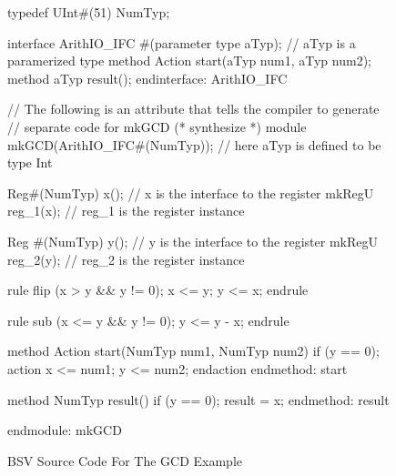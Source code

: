 \documentclass{article}
\newenvironment{libverbatim}
  {\small
   \verbatim}
  {\endverbatim
  }
\newenvironment{fminipage}[1][6 in]
  {\begin{lrbox}{\fminibox}\begin{minipage}[c]{6 in}}
  {\end{minipage}\end{lrbox}\fbox{\usebox{\fminibox}}}
\begin{document}
\begin{figure}
\begin{fminipage}
\begin{libverbatim}
typedef UInt#(51) NumTyp;

interface ArithIO_IFC #(parameter type aTyp); // aTyp is a paramerized type
    method Action start(aTyp num1, aTyp num2);
    method aTyp result();
endinterface: ArithIO_IFC

// The following is an attribute that tells the compiler to generate
// separate code for mkGCD
(* synthesize *)
module mkGCD(ArithIO_IFC#(NumTyp)); // here aTyp is defined to be type Int

    Reg#(NumTyp) x(); // x is the interface to the register
    mkRegU reg_1(x);  // reg_1 is the register instance

    Reg #(NumTyp) y(); // y is the interface to the register
    mkRegU reg_2(y);   // reg_2 is the register instance

    rule flip (x > y && y != 0);
        x <= y;
        y <= x;
    endrule

    rule sub (x <= y && y != 0);
        y <= y - x;
    endrule

    method Action start(NumTyp num1, NumTyp num2) if (y == 0);
        action
            x <= num1;
            y <= num2;
        endaction
    endmethod: start

    method NumTyp result() if (y == 0);
        result = x;
    endmethod: result

endmodule: mkGCD
\end{libverbatim}
\end{fminipage}
  \caption{\label{gcd_bsv-fig}BSV Source Code For The GCD Example}
\end{figure}
\end{document}
